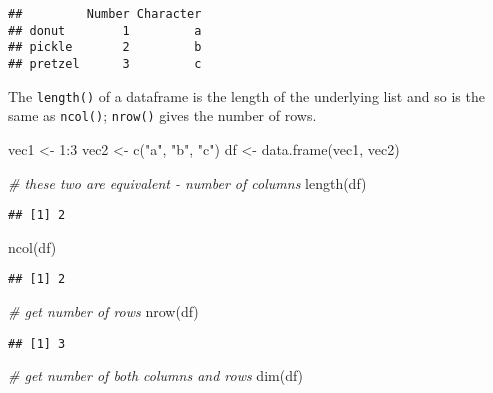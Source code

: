 \documentclass[
]{book}
\newenvironment{Shaded}{\begin{snugshade}}{\end{snugshade}}
\newcommand{\CommentTok}[1]{\textcolor[rgb]{0.56,0.35,0.01}{\textit{#1}}}
\newcommand{\DecValTok}[1]{\textcolor[rgb]{0.00,0.00,0.81}{#1}}
\newcommand{\FunctionTok}[1]{\textcolor[rgb]{0.00,0.00,0.00}{#1}}
\newcommand{\NormalTok}[1]{#1}
\newcommand{\OtherTok}[1]{\textcolor[rgb]{0.56,0.35,0.01}{#1}}
\newcommand{\SpecialCharTok}[1]{\textcolor[rgb]{0.00,0.00,0.00}{#1}}
\newcommand{\StringTok}[1]{\textcolor[rgb]{0.31,0.60,0.02}{#1}}
\begin{document}
\begin{verbatim}
##         Number Character
## donut        1         a
## pickle       2         b
## pretzel      3         c
\end{verbatim}

The \texttt{length()} of a dataframe is the length of the underlying list and so is the same as \texttt{ncol()}; \texttt{nrow()} gives the number of rows.

\begin{Shaded}
\begin{Highlighting}[]
\NormalTok{vec1 }\OtherTok{\textless{}{-}} \DecValTok{1}\SpecialCharTok{:}\DecValTok{3}
\NormalTok{vec2 }\OtherTok{\textless{}{-}} \FunctionTok{c}\NormalTok{(}\StringTok{"a"}\NormalTok{, }\StringTok{"b"}\NormalTok{, }\StringTok{"c"}\NormalTok{)}
\NormalTok{df }\OtherTok{\textless{}{-}} \FunctionTok{data.frame}\NormalTok{(vec1, vec2)}

\CommentTok{\# these two are equivalent {-} number of columns}
\FunctionTok{length}\NormalTok{(df)}
\end{Highlighting}
\end{Shaded}

\begin{verbatim}
## [1] 2
\end{verbatim}

\begin{Shaded}
\begin{Highlighting}[]
\FunctionTok{ncol}\NormalTok{(df)}
\end{Highlighting}
\end{Shaded}

\begin{verbatim}
## [1] 2
\end{verbatim}

\begin{Shaded}
\begin{Highlighting}[]
\CommentTok{\# get number of rows}
\FunctionTok{nrow}\NormalTok{(df)}
\end{Highlighting}
\end{Shaded}

\begin{verbatim}
## [1] 3
\end{verbatim}

\begin{Shaded}
\begin{Highlighting}[]
\CommentTok{\# get number of both columns and rows}
\FunctionTok{dim}\NormalTok{(df)}
\end{Highlighting}
\end{Shaded}
\end{document}
